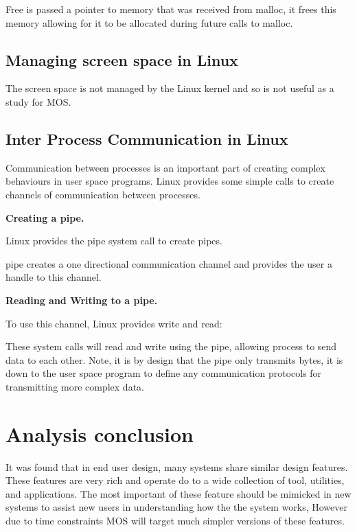 \documentclass[a4paper]{report}
\begin{document}
Free is passed a pointer to memory that was received from malloc, it frees this memory allowing for it to be allocated during future calls to malloc.

\clearpage

\subsection{Managing screen space in Linux}

The screen space is not managed by the Linux kernel and so is not useful as a study for MOS.

\subsection{Inter Process Communication in Linux}

Communication between processes is an important part of creating complex behaviours in user space programs. Linux provides some simple calls to create channels of communication between processes.

\noindent
\textbf{Creating a pipe.}

Linux provides the pipe system call to create pipes. \cite{manPipe}

pipe creates a one directional communication channel and provides the user a handle to this channel.

\noindent
\textbf{Reading and Writing to a pipe.}

To use this channel, Linux provides write and read: \cite{manWrite} \cite{manRead}

These system calls will read and write using the pipe, allowing process to send data to each other. Note, it is by design that the pipe only transmits bytes, it is down to the user space program to define any communication protocols for transmitting more complex data.

\section{Analysis conclusion}

It was found that in end user design, many systems share similar design features. These features are very rich and operate do to a wide collection of tool, utilities, and applications. The most important of these feature should be mimicked in new systems to assist new users in understanding how the the system works, However due to time constraints MOS will target much simpler versions of these features.
\end{document}
